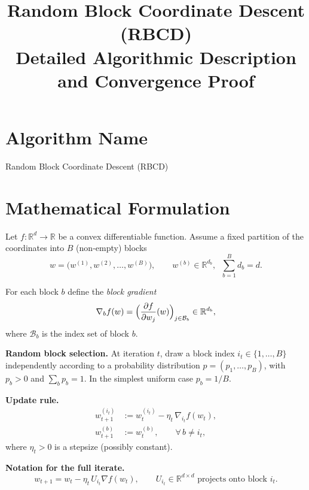 \documentclass[11pt]{article}
\newcommand{\R}{\mathbb{R}}
\begin{document}
\title{Random Block Coordinate Descent \\ (RBCD) \\ Detailed Algorithmic Description and Convergence Proof}
\author{}
\date{}
\maketitle

\tableofcontents
\newpage

\section*{Algorithm Name}
Random Block Coordinate Descent (RBCD)

\section*{Mathematical Formulation}
Let $f:\R^{d}\rightarrow\R$ be a convex differentiable function.  
Assume a fixed partition of the coordinates into $B$ (non‑empty) blocks
\[
w=\bigl(w^{(1)},w^{(2)},\dots ,w^{(B)}\bigr),\qquad 
w^{(b)}\in\R^{d_b},\;\; \sum_{b=1}^{B}d_b=d .
\]

For each block $b$ define the \emph{block gradient} 
\[
\nabla_{b}f(w)=\Bigl(\frac{\partial f}{\partial w_j}(w)\Bigr)_{j\in\mathcal{B}_b}
\in\R^{d_b},
\]
where $\mathcal{B}_b$ is the index set of block $b$.

\medskip
\noindent\textbf{Random block selection.}  
At iteration $t$, draw a block index $i_t\in\{1,\dots ,B\}$ independently
according to a probability distribution $p=(p_1,\dots ,p_B)$,
with $p_b>0$ and $\sum_{b}p_b=1$.  
In the simplest uniform case $p_b=1/B$.

\medskip
\noindent\textbf{Update rule.}
\[
\boxed{
\begin{aligned}
w^{(i_t)}_{t+1} &:= w^{(i_t)}_{t} - \eta_t \,\nabla_{i_t}f(w_t),\\[2mm]
w^{(b)}_{t+1} &:= w^{(b)}_{t},\qquad\forall\,b\neq i_t,
\end{aligned}}
\]
where $\eta_t>0$ is a stepsize (possibly constant).

\medskip
\noindent\textbf{Notation for the full iterate.}
\[
w_{t+1}= w_t - \eta_t\,U_{i_t}\nabla f(w_t),\qquad 
U_{i_t}\in\R^{d\times d}
\text{ projects onto block }i_t .
\]
\end{document}

